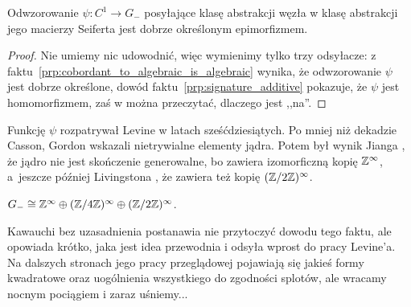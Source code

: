 \begin{proposition}
    Odwzorowanie $\psi \colon C^1 \to G_-$ posyłające klasę abstrakcji węzła w klasę abstrakcji jego macierzy Seiferta jest dobrze określonym epimorfizmem.
\end{proposition}

\begin{proof}
    Nie umiemy nic udowodnić, więc wymienimy tylko trzy odsyłacze: z faktu~\ref{prp:cobordant_to_algebraic_is_algebraic} wynika, że odwzorowanie $\psi$ jest dobrze określone, dowód faktu~\ref{prp:signature_additive} pokazuje, że $\psi$ jest homomorfizmem, zaś w \cite[s. 62]{kawauchi1996} można przeczytać, dlaczego jest ,,na''.
\end{proof}

Funkcję $\psi$ rozpatrywał Levine \cite{levine1969} w latach sześćdziesiątych.
%
Po mniej niż dekadzie Casson, Gordon \cite{casson1978} wskazali nietrywialne elementy jądra.
%
%
Potem był wynik Jianga \cite{jiang1981}, że jądro nie jest skończenie generowalne, bo zawiera izomorficzną kopię $\mathbb Z^\infty$, a~jeszcze później Livingstona \cite{livingston1999}, że zawiera też kopię $(\mathbb Z/2\mathbb Z)^\infty$.
%
%

\begin{proposition}
    $G_- \cong \mathbb Z^\infty \oplus (\mathbb Z/4\mathbb Z)^\infty \oplus (\mathbb Z/2\mathbb Z)^\infty$.
\end{proposition}

Kawauchi \cite[s. 161]{kawauchi1996} bez uzasadnienia postanawia nie przytoczyć dowodu tego faktu, ale opowiada krótko, jaka jest idea przewodnia i odsyła wprost do pracy Levine'a.
Na dalszych stronach jego pracy przeglądowej pojawiają się jakieś formy kwadratowe oraz uogólnienia wszystkiego do zgodności splotów, ale wracamy nocnym pociągiem i zaraz uśniemy...

